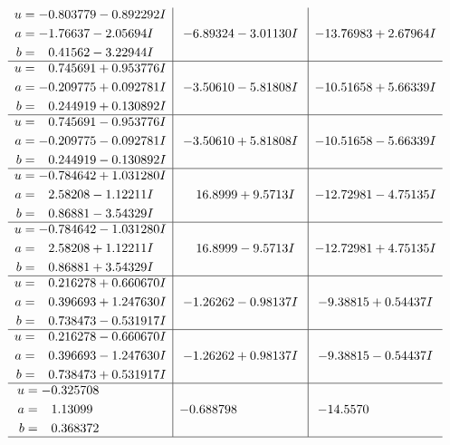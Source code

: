 \documentclass[1p]{elsarticle_modified}
\theoremstyle{definition}
\begin{document}
$$\begin{array}{c|c|c}
\begin{aligned}
u &= -0.803779 - 0.892292 I \\
a &= -1.76637 - 2.05694 I \\
b &= \phantom{-}0.41562 - 3.22944 I\end{aligned}
 & -6.89324 - 3.01130 I & -13.76983 + 2.67964 I \\ \hline\begin{aligned}
u &= \phantom{-}0.745691 + 0.953776 I \\
a &= -0.209775 + 0.092781 I \\
b &= \phantom{-}0.244919 + 0.130892 I\end{aligned}
 & -3.50610 - 5.81808 I & -10.51658 + 5.66339 I \\ \hline\begin{aligned}
u &= \phantom{-}0.745691 - 0.953776 I \\
a &= -0.209775 - 0.092781 I \\
b &= \phantom{-}0.244919 - 0.130892 I\end{aligned}
 & -3.50610 + 5.81808 I & -10.51658 - 5.66339 I \\ \hline\begin{aligned}
u &= -0.784642 + 1.031280 I \\
a &= \phantom{-}2.58208 - 1.12211 I \\
b &= \phantom{-}0.86881 - 3.54329 I\end{aligned}
 & \phantom{-}16.8999 + 9.5713 I & -12.72981 - 4.75135 I \\ \hline\begin{aligned}
u &= -0.784642 - 1.031280 I \\
a &= \phantom{-}2.58208 + 1.12211 I \\
b &= \phantom{-}0.86881 + 3.54329 I\end{aligned}
 & \phantom{-}16.8999 - 9.5713 I & -12.72981 + 4.75135 I \\ \hline\begin{aligned}
u &= \phantom{-}0.216278 + 0.660670 I \\
a &= \phantom{-}0.396693 + 1.247630 I \\
b &= \phantom{-}0.738473 - 0.531917 I\end{aligned}
 & -1.26262 - 0.98137 I & -9.38815 + 0.54437 I \\ \hline\begin{aligned}
u &= \phantom{-}0.216278 - 0.660670 I \\
a &= \phantom{-}0.396693 - 1.247630 I \\
b &= \phantom{-}0.738473 + 0.531917 I\end{aligned}
 & -1.26262 + 0.98137 I & -9.38815 - 0.54437 I \\ \hline\begin{aligned}
u &= -0.325708\phantom{ +0.000000I} \\
a &= \phantom{-}1.13099\phantom{ +0.000000I} \\
b &= \phantom{-}0.368372\phantom{ +0.000000I}\end{aligned}
 & -0.688798\phantom{ +0.000000I} & -14.5570\phantom{ +0.000000I}\\
 \hline 
 \end{array}$$\newpage\newpage\renewcommand{\arraystretch}{1}
\end{document}
